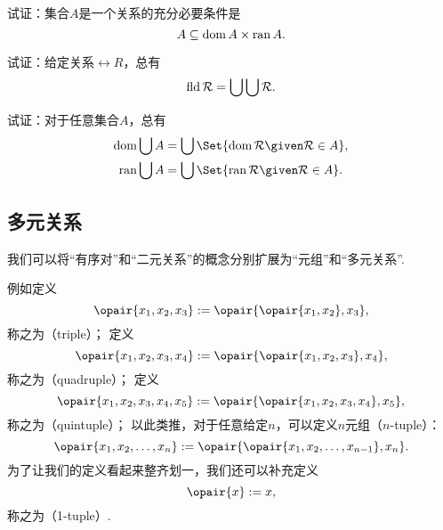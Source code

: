 \begin{example}
试证：集合\(A\)是一个关系的充分必要条件是\begin{equation*}
	A \subseteq \operatorname{dom} A \times \operatorname{ran} A.
\end{equation*}
\end{example}

\begin{example}
试证：给定关系\(\rel{R}\)，总有\begin{equation*}
	\operatorname{fld} \mathcal{R} = \bigcup\bigcup \mathcal{R}.
\end{equation*}
\end{example}

\begin{example}
试证：对于任意集合\(A\)，总有\begin{gather}
	\dom\bigcup A = \bigcup\Set{ \dom\rel{R} \given \rel{R} \in A }, \\
	\ran\bigcup A = \bigcup\Set{ \ran\rel{R} \given \rel{R} \in A }.
\end{gather}
\end{example}

\subsection{多元关系}
我们可以将“有序对”和“二元关系”的概念分别扩展为“元组”和“多元关系”.

例如定义\begin{equation*}
	\opair{x_1,x_2,x_3}
	\defeq
	\opair{\opair{x_1,x_2},x_3},
\end{equation*}
称之为（triple）；
定义\begin{equation*}
	\opair{x_1,x_2,x_3,x_4}
	\defeq
	\opair{\opair{x_1,x_2,x_3},x_4},
\end{equation*}
称之为（quadruple）；
定义\begin{equation*}
	\opair{x_1,x_2,x_3,x_4,x_5}
	\defeq
	\opair{\opair{x_1,x_2,x_3,x_4},x_5},
\end{equation*}
称之为（quintuple）；
以此类推，对于任意给定\(n\)，可以定义\(n\)元组（\(n\)-tuple）：\begin{equation*}
	\opair{x_1,x_2,\dotsc,x_n}
	\defeq
	\opair{\opair{x_1,x_2,\dotsc,x_{n-1}},x_n}.
\end{equation*}
为了让我们的定义看起来整齐划一，我们还可以补充定义\begin{equation*}
	\opair{x} \defeq x,
\end{equation*}
称之为（1-tuple）.

